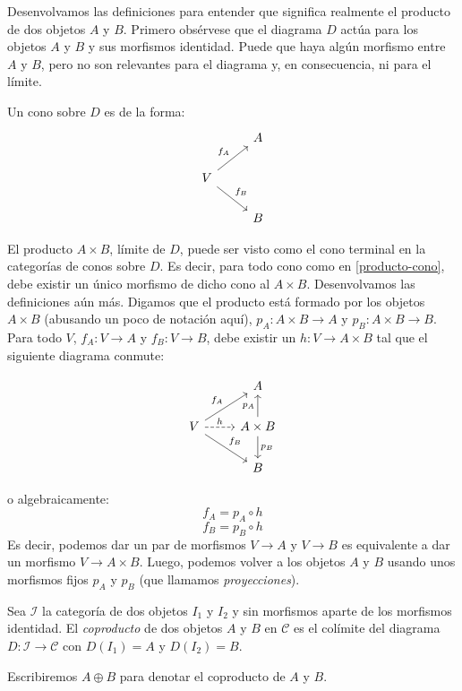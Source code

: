 \documentclass[12pt, twoside]{book}
\newcommand{\cat}{{\mathcal{C}}}
\begin{document}
Desenvolvamos las definiciones para entender que significa realmente el producto de dos objetos $A$ y $B$.
Primero obsérvese que el diagrama $D$ actúa para  los objetos $A$ y $B$ y sus morfismos identidad.
Puede que haya algún morfismo entre $A$ y $B$, pero no son relevantes para el diagrama y, en consecuencia, ni para el límite.

Un cono sobre $D$ es de la forma:
\begin{equation}\label{producto-cono} \begin{tikzcd}
 & A\\
V \arrow[ur,"f_A"] \arrow[dr,"f_B"]\\
 & B
\end{tikzcd} \end{equation}

El producto $A \times B$, límite de $D$, puede ser visto como el cono terminal en la categorías de conos sobre $D$.
Es decir, para todo cono como en \ref{producto-cono}, debe existir un único morfismo de dicho cono al $A \times B$.
Desenvolvamos las definiciones aún más.
Digamos que el producto está formado por los objetos $A \times B$ (abusando un poco de notación aquí), $p_A \colon A \times B \to A$ y $p_B \colon A \times B \to B$.
Para todo $V$, $f_A \colon V \to A$ y $f_B \colon V \to B$, debe existir un $h \colon V \to A \times B$ tal que el siguiente diagrama conmute:

\[\begin{tikzcd}
 & A\\
V \arrow[ur,"f_A"] \arrow[dr,"f_B"] \arrow[r,dashed,"h"] & A \times B \arrow[u,"p_A"] \arrow[d,"p_B"]\\
 & B
\end{tikzcd}\]

o algebraicamente:
\[ f_A = p_A \circ h \]
\[ f_B = p_B \circ h \]
Es decir, podemos dar un par de morfismos $V \to A$ y $V \to B$ es equivalente a dar un morfismo $V \to A \times B$.
Luego, podemos volver a los objetos $A$ y $B$ usando unos morfismos fijos $p_A$ y $p_B$ (que llamamos \emph{proyecciones}).

\begin{definition}
Sea $\mathcal{I}$ la categoría de dos objetos $I_1$ y $I_2$ y sin morfismos aparte de los morfismos identidad. El \emph{coproducto} de dos objetos $A$ y $B$ en $\cat$ es el colímite del diagrama $D \colon \mathcal{I} \to \cat$ con $D(I_1) = A$ y $D(I_2) = B$.

Escribiremos $A \oplus B$ para denotar el coproducto de $A$ y $B$.
\end{definition}
\end{document}
